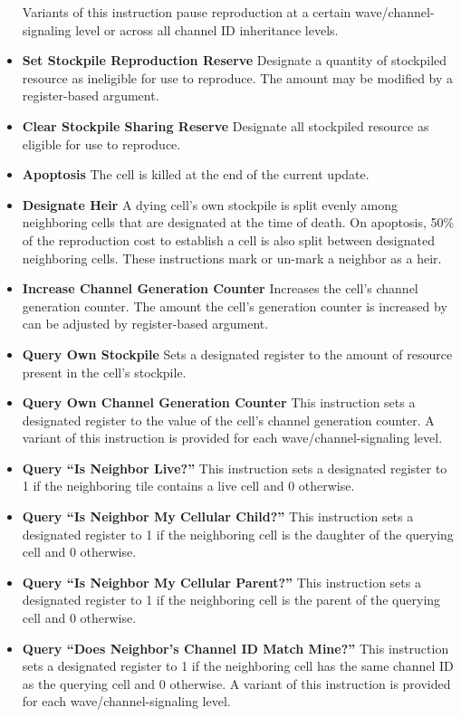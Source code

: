 \begin{itemize}
Variants of this instruction pause reproduction at a certain wave/channel-signaling level or across all channel ID inheritance levels.
\item \textbf{Set Stockpile Reproduction Reserve}
Designate a quantity of stockpiled resource as ineligible for use to reproduce.
The amount may be modified by a register-based argument.
\item \textbf{Clear Stockpile Sharing Reserve}
Designate all stockpiled resource as eligible for use to reproduce.
\item \textbf{Apoptosis}
The cell is killed at the end of the current update.
\item \textbf{Designate Heir} A dying cell's own stockpile is split evenly among neighboring cells that are designated at the time of death.
On apoptosis, 50\% of the reproduction cost to establish a cell is also split between designated neighboring cells.
These instructions mark or un-mark a neighbor as a heir.
\item \textbf{Increase Channel Generation Counter}
Increases the cell's channel generation counter.
The amount the cell's generation counter is increased by can be adjusted by register-based argument.
\item \textbf{Query Own Stockpile}
Sets a designated register to the amount of resource present in the cell's stockpile.
\item \textbf{Query Own Channel Generation Counter}
This instruction sets a designated register to the value of the cell's channel generation counter.
A variant of this instruction is provided for each wave/channel-signaling level.
\item \textbf{Query ``Is Neighbor Live?''}
This instruction sets a designated register to 1 if the neighboring tile contains a live cell and 0 otherwise.
\item \textbf{Query ``Is Neighbor My Cellular Child?''}
This instruction sets a designated register to 1 if the neighboring cell is the daughter of the querying cell and 0 otherwise.
\item \textbf{Query ``Is Neighbor My Cellular Parent?''}
This instruction sets a designated register to 1 if the neighboring cell is the parent of the querying cell and 0 otherwise.
\item \textbf{Query ``Does Neighbor's Channel ID Match Mine?''}
This instruction sets a designated register to 1 if the neighboring cell has the same channel ID as the querying cell and 0 otherwise.
A variant of this instruction is provided for each wave/channel-signaling level.

\end{itemize}
